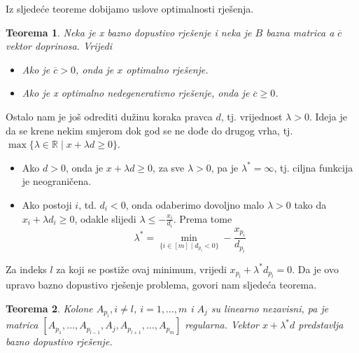 \documentclass[a4paper, utf8, 11pt, colorlinks]{article}
\newtheorem{thm}{Teorema}
\begin{document}
Iz sljedeće teoreme dobijamo uslove optimalnosti rješenja.

\begin{thm}
  Neka je x bazno dopustivo rješenje i neka je $B$ bazna matrica a $\overline{c}$ vektor doprinosa. Vrijedi 
  \begin{itemize}
      \item Ako je $\overline{c} >0$, onda je $x$ optimalno rješenje.
      \item Ako je x optimalno nedegenerativno rješenje, onda je $\overline{c} \geq 0$.
  \end{itemize}
\end{thm}

Ostalo nam je još odrediti dužinu koraka pravca $d$, tj. vrijednost $\lambda>0$. Ideja je da se krene nekim smjerom dok god se ne dođe do drugog vrha, tj. $\max \{ \lambda \in \mathbb{R} \mid x + \lambda d \geq 0 \}$. 
\begin{itemize}
    \item Ako $d >0$, onda je $  x + \lambda d \geq 0$, za sve $\lambda > 0$, pa je $\lambda^* = \infty$, tj. ciljna funkcija je neograničena.
    \item Ako postoji $i$, td. $d_i < 0$, onda odaberimo dovoljno malo $\lambda>0$ tako da $x_i + \lambda d_i \geq 0$, odakle slijedi $\lambda \leq -\frac{x_i}{d_i}$. Prema tome 
    $$ \lambda^* = \min_{ \{i\in [m] \mid d_{p_i} < 0  \}} - \frac{x_{p_i}}{d_{p_i}} $$
\end{itemize}
Za indeks $l$ za koji se postiže ovaj minimum, vrijedi $x_{p_l} + \lambda^* d_{p_l}=0$.
Da je ovo upravo bazno dopustivo rješenje problema, govori nam sljedeća teorema. 
\begin{thm}
    Kolone $A_{p_i}, i\not = l$, $i=1,\ldots,m$ i $A_{j}$ su linearno nezavisni, pa je matrica 
    $[A_{p_1},\ldots, A_{p_{l-1}}, A_j, A_{p_{l+1}}, \ldots, A_{p_m}]$
    regularna. Vektor $x + \lambda^* d$ predstavlja bazno dopustivo rješenje. 
\end{thm}
\end{document}
